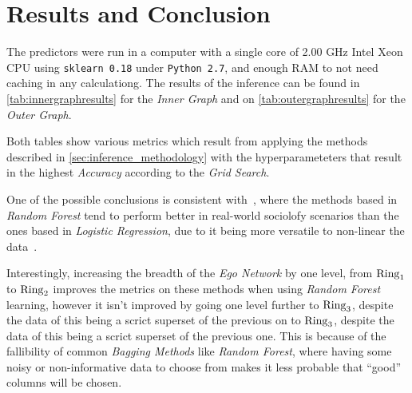 \section{Results and Conclusion}
\label{sec:results}


The predictors were run in a computer with a single core of 2.00 GHz Intel Xeon CPU using \texttt{sklearn 0.18} under \texttt{Python 2.7}, and enough RAM to not need caching in any calculationg. The results of the inference can be found in \cref{tab:innergraphresults} for the \emph{Inner Graph} and on \cref{tab:outergraphresults} for the \emph{Outer Graph}.


Both tables show various metrics which result from applying the methods described in \cref{sec:inference_methodology} with the hyperparameteters that result in the highest \emph{Accuracy} according to the \emph{Grid Search}.

One of the possible conclusions is consistent with~\cite{muchlinski2016}, where the methods based in \emph{Random Forest} tend to perform better in real-world sociolofy scenarios than the ones based in \emph{Logistic Regression}, due to it being more versatile to non-linear the data~\cite{logisticvsdecision}.

Interestingly, increasing the breadth of the \emph{Ego Network} by one level, from $\operatorname{Ring}_1$ to $\operatorname{Ring}_2$ improves the metrics on these methods when using \emph{Random Forest} learning, however it isn't improved by going one level further to $\operatorname{Ring}_3$, despite the data of this being a scrict superset of the previous on to $\operatorname{Ring}_3$, despite the data of this being a scrict superset of the previous one. This is because of the fallibility of common \emph{Bagging Methods} like \emph{Random Forest}, where having some noisy or non-informative data to choose from makes it less probable that ``good'' columns will be chosen.

